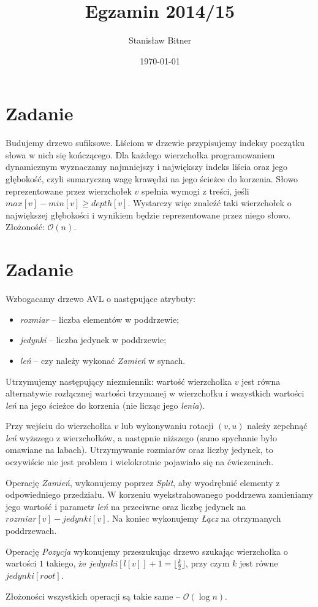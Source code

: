 \documentclass[12pt, a4paper]{article}
\title{Egzamin 2014/15}
\author{Stanisław Bitner}
\date{\today}
\newcommand{\MCALO}{\mathcal{O}}
\newcounter{zadanie}
\newcommand{\zadanie}{\addtocounter{zadanie}{1}\section*{Zadanie \arabic{zadanie}}}
\begin{document}
\maketitle
\zadanie{}
Budujemy drzewo sufiksowe. Liściom w drzewie przypisujemy indeksy początku
słowa w nich się kończącego. Dla każdego wierzchołka programowaniem dynamicznym
wyznaczamy najmniejszy i największy indeks liścia oraz jego głębokość, czyli
sumaryczną wagę krawędzi na jego ścieżce do korzenia. Słowo reprezentowane
przez wierzchołek $v$ spełnia wymogi z treści, jeśli $max[v] - min[v] \ge
depth[v]$. Wystarczy więc znaleźć taki wierzchołek o największej głębokości
i wynikiem będzie reprezentowane przez niego słowo.
Złożoność: $\MCALO(n)$.

\zadanie{}
Wzbogacamy drzewo AVL o następujące atrybuty:
\begin{itemize}
  \item \textit{rozmiar} -- liczba elementów w poddrzewie;
  \item \textit{jedynki} -- liczba jedynek w poddrzewie;
  \item \textit{leń} -- czy należy wykonać \textit{Zamień} w synach.
\end{itemize}

Utrzymujemy następujący niezmiennik: wartość wierzchołka $v$ jest równa
alternatywie rozłącznej wartości trzymanej w wierzchołku i wszystkich wartości
\textit{leń} na jego ścieżce do korzenia (nie licząc jego \textit{lenia}).

Przy wejściu do wierzchołka $v$ lub wykonywaniu rotacji $(v,u)$ należy zepchnąć
\textit{leń} wyższego z wierzchołków, a następnie niższego (samo spychanie było
omawiane na labach). Utrzymywanie rozmiarów oraz liczby jedynek, to oczywiście
nie jest problem i wielokrotnie pojawiało się na ćwiczeniach.

Operację \textit{Zamień}, wykonujemy poprzez \textit{Split}, aby wyodrębnić elementy
z odpowiedniego przedziału. W korzeniu wyekstrahowanego poddrzewa zamieniamy
jego wartość i parametr \textit{leń} na przeciwne oraz liczbę jedynek na
$rozmiar[v] - jedynki[v]$. Na koniec wykonujemy \textit{Łącz} na otrzymanych
poddrzewach.

Operację \textit{Pozycja} wykonujemy przeszukując drzewo szukając wierzchołka
o wartości $1$ takiego, że $\mathit{jedynki}[l[v]]
+ 1 = \lfloor\frac{k}{2}\rfloor$, przy czym $k$ jest równe
$\mathit{jedynki}[root]$.

Złożoności wszystkich operacji są takie same -- $\MCALO(\log{n})$.
\end{document}
